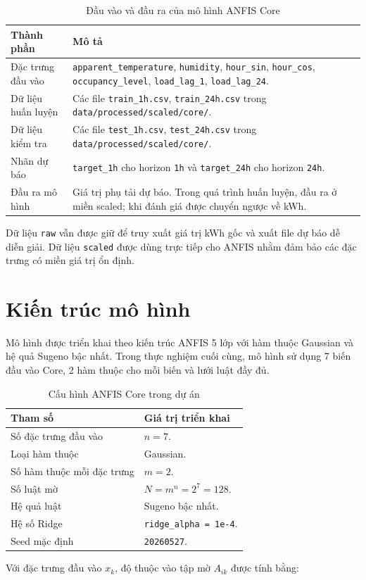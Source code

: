 \begin{table}[H]
  \centering
  \begin{tabular}{p{4.4cm} p{8.8cm}}
    \toprule
    \textbf{Thành phần} & \textbf{Mô tả} \\
    \midrule
    Đặc trưng đầu vào & \texttt{apparent\_temperature}, \texttt{humidity}, \texttt{hour\_sin}, \texttt{hour\_cos}, \texttt{occupancy\_level}, \texttt{load\_lag\_1}, \texttt{load\_lag\_24}. \\
    Dữ liệu huấn luyện & Các file \texttt{train\_1h.csv}, \texttt{train\_24h.csv} trong \texttt{data/processed/scaled/core/}. \\
    Dữ liệu kiểm tra & Các file \texttt{test\_1h.csv}, \texttt{test\_24h.csv} trong \texttt{data/processed/scaled/core/}. \\
    Nhãn dự báo & \texttt{target\_1h} cho horizon \texttt{1h} và \texttt{target\_24h} cho horizon \texttt{24h}. \\
    Đầu ra mô hình & Giá trị phụ tải dự báo. Trong quá trình huấn luyện, đầu ra ở miền scaled; khi đánh giá được chuyển ngược về kWh. \\
    \bottomrule
  \end{tabular}
  \caption{Đầu vào và đầu ra của mô hình ANFIS Core}
\end{table}
Dữ liệu \texttt{raw} vẫn được giữ để truy xuất giá trị kWh gốc và xuất file dự báo dễ diễn giải. Dữ liệu \texttt{scaled} được dùng trực tiếp cho ANFIS nhằm đảm bảo các đặc trưng có miền giá trị ổn định.

\section{Kiến trúc mô hình}

Mô hình được triển khai theo kiến trúc ANFIS 5 lớp với hàm thuộc Gaussian và hệ quả Sugeno bậc nhất. Trong thực nghiệm cuối cùng, mô hình sử dụng 7 biến đầu vào Core, 2 hàm thuộc cho mỗi biến và lưới luật đầy đủ.

\begin{table}[H]
  \centering
  \begin{tabular}{p{6.4cm} p{6.8cm}}
    \toprule
    \textbf{Tham số} & \textbf{Giá trị triển khai} \\
    \midrule
    Số đặc trưng đầu vào & $n = 7$. \\
    Loại hàm thuộc & Gaussian. \\
    Số hàm thuộc mỗi đặc trưng & $m = 2$. \\
    Số luật mờ & $N = m^n = 2^7 = 128$. \\
    Hệ quả luật & Sugeno bậc nhất. \\
    Hệ số Ridge & \texttt{ridge\_alpha = 1e-4}. \\
    Seed mặc định & \texttt{20260527}. \\
    \bottomrule
  \end{tabular}
  \caption{Cấu hình ANFIS Core trong dự án}
\end{table}
Với đặc trưng đầu vào $x_k$, độ thuộc vào tập mờ $A_{ik}$ được tính bằng:

